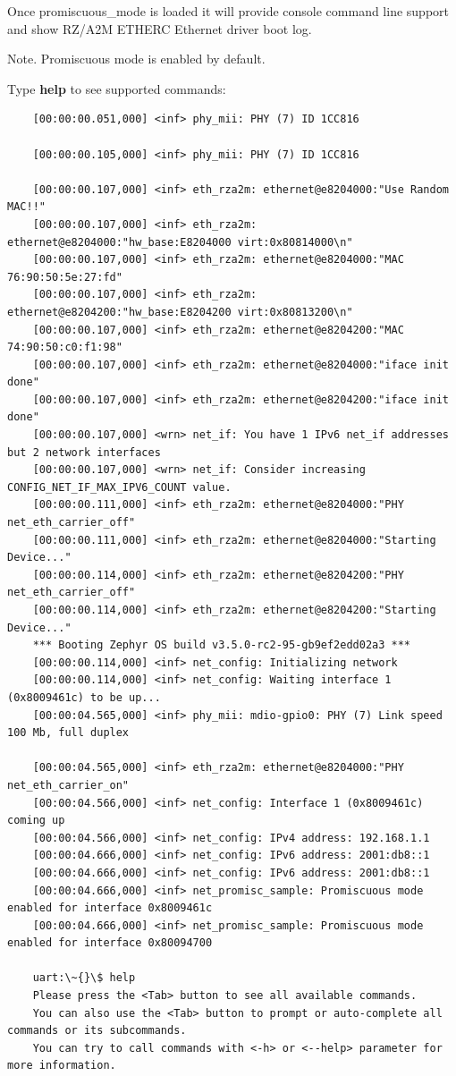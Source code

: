 \documentclass[11pt,a4paper,oneside]{article}
\begin{document}
Once promiscuous\_mode is loaded it will provide console command line support and show  RZ/A2M ETHERC Ethernet driver boot log.

Note. Promiscuous mode is enabled by default.

Type \textbf{help} to see supported commands:
\begin{lstlisting}
	[00:00:00.051,000] <inf> phy_mii: PHY (7) ID 1CC816

	[00:00:00.105,000] <inf> phy_mii: PHY (7) ID 1CC816

	[00:00:00.107,000] <inf> eth_rza2m: ethernet@e8204000:"Use Random MAC!!"
	[00:00:00.107,000] <inf> eth_rza2m: ethernet@e8204000:"hw_base:E8204000 virt:0x80814000\n"
	[00:00:00.107,000] <inf> eth_rza2m: ethernet@e8204000:"MAC 76:90:50:5e:27:fd"
	[00:00:00.107,000] <inf> eth_rza2m: ethernet@e8204200:"hw_base:E8204200 virt:0x80813200\n"
	[00:00:00.107,000] <inf> eth_rza2m: ethernet@e8204200:"MAC 74:90:50:c0:f1:98"
	[00:00:00.107,000] <inf> eth_rza2m: ethernet@e8204000:"iface init done"
	[00:00:00.107,000] <inf> eth_rza2m: ethernet@e8204200:"iface init done"
	[00:00:00.107,000] <wrn> net_if: You have 1 IPv6 net_if addresses but 2 network interfaces
	[00:00:00.107,000] <wrn> net_if: Consider increasing CONFIG_NET_IF_MAX_IPV6_COUNT value.
	[00:00:00.111,000] <inf> eth_rza2m: ethernet@e8204000:"PHY net_eth_carrier_off"
	[00:00:00.111,000] <inf> eth_rza2m: ethernet@e8204000:"Starting Device..."
	[00:00:00.114,000] <inf> eth_rza2m: ethernet@e8204200:"PHY net_eth_carrier_off"
	[00:00:00.114,000] <inf> eth_rza2m: ethernet@e8204200:"Starting Device..."
	*** Booting Zephyr OS build v3.5.0-rc2-95-gb9ef2edd02a3 ***
	[00:00:00.114,000] <inf> net_config: Initializing network
	[00:00:00.114,000] <inf> net_config: Waiting interface 1 (0x8009461c) to be up...
	[00:00:04.565,000] <inf> phy_mii: mdio-gpio0: PHY (7) Link speed 100 Mb, full duplex

	[00:00:04.565,000] <inf> eth_rza2m: ethernet@e8204000:"PHY net_eth_carrier_on"
	[00:00:04.566,000] <inf> net_config: Interface 1 (0x8009461c) coming up
	[00:00:04.566,000] <inf> net_config: IPv4 address: 192.168.1.1
	[00:00:04.666,000] <inf> net_config: IPv6 address: 2001:db8::1
	[00:00:04.666,000] <inf> net_config: IPv6 address: 2001:db8::1
	[00:00:04.666,000] <inf> net_promisc_sample: Promiscuous mode enabled for interface 0x8009461c
	[00:00:04.666,000] <inf> net_promisc_sample: Promiscuous mode enabled for interface 0x80094700

	uart:\~{}\$ help
	Please press the <Tab> button to see all available commands.
	You can also use the <Tab> button to prompt or auto-complete all commands or its subcommands.
	You can try to call commands with <-h> or <--help> parameter for more information.


\end{lstlisting}
\end{document}
